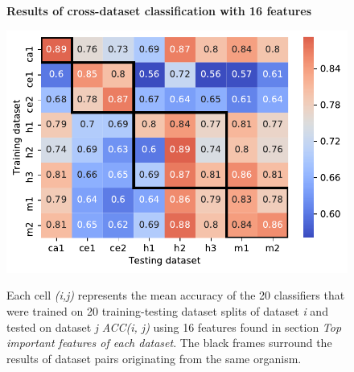 \begin{figure}[h!]
  \caption{\textbf{Results of cross-dataset classification with 16 features}} 
      \includegraphics[width = 1\textwidth]{figures/diff_summary_16.pdf}
    \label{fig:crossdataset16}
    \caption*{Each cell \textit{(i,j)} represents the mean accuracy of the 20 classifiers that were trained on 20 training-testing dataset splits of dataset \textit{i} and tested on dataset \textit{j} \textit{ACC(i, j)} using 16 features found in section \textit{Top important features of each dataset}. The black frames surround the results of dataset pairs originating from the same organism.}
      \end{figure}




